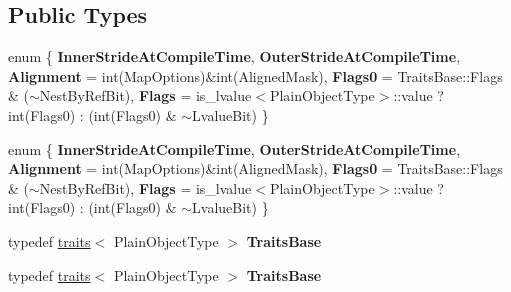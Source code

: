 \subsection*{Public Types}
\begin{DoxyCompactItemize}
\item 
\mbox{\label{struct_eigen_1_1internal_1_1traits_3_01_map_3_01_plain_object_type_00_01_map_options_00_01_stride_type_01_4_01_4_ae6e8827c96c1ec622268218d13fa9548}} 
enum \{ \newline
{\bfseries Inner\+Stride\+At\+Compile\+Time}, 
{\bfseries Outer\+Stride\+At\+Compile\+Time}, 
{\bfseries Alignment} = int(Map\+Options)\&int(Aligned\+Mask), 
{\bfseries Flags0} = Traits\+Base\+:\+:Flags \& ($\sim$\+Nest\+By\+Ref\+Bit), 
\newline
{\bfseries Flags} = is\+\_\+lvalue$<$Plain\+Object\+Type$>$\+:\+:value ? int(Flags0) \+: (int(Flags0) \& $\sim$\+Lvalue\+Bit)
 \}
\item 
\mbox{\label{struct_eigen_1_1internal_1_1traits_3_01_map_3_01_plain_object_type_00_01_map_options_00_01_stride_type_01_4_01_4_ab49ddda03c9b47bc6e1291ee45377602}} 
enum \{ \newline
{\bfseries Inner\+Stride\+At\+Compile\+Time}, 
{\bfseries Outer\+Stride\+At\+Compile\+Time}, 
{\bfseries Alignment} = int(Map\+Options)\&int(Aligned\+Mask), 
{\bfseries Flags0} = Traits\+Base\+:\+:Flags \& ($\sim$\+Nest\+By\+Ref\+Bit), 
\newline
{\bfseries Flags} = is\+\_\+lvalue$<$Plain\+Object\+Type$>$\+:\+:value ? int(Flags0) \+: (int(Flags0) \& $\sim$\+Lvalue\+Bit)
 \}
\item 
\mbox{\label{struct_eigen_1_1internal_1_1traits_3_01_map_3_01_plain_object_type_00_01_map_options_00_01_stride_type_01_4_01_4_a90f1edf2f2637a65bed060bb57b0c43e}} 
typedef \hyperlink{struct_eigen_1_1internal_1_1traits}{traits}$<$ Plain\+Object\+Type $>$ {\bfseries Traits\+Base}
\item 
\mbox{\label{struct_eigen_1_1internal_1_1traits_3_01_map_3_01_plain_object_type_00_01_map_options_00_01_stride_type_01_4_01_4_a90f1edf2f2637a65bed060bb57b0c43e}} 
typedef \hyperlink{struct_eigen_1_1internal_1_1traits}{traits}$<$ Plain\+Object\+Type $>$ {\bfseries Traits\+Base}
\end{DoxyCompactItemize}


